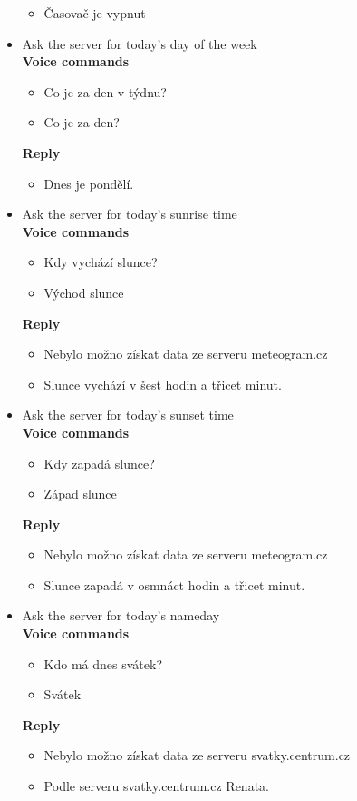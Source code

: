 \begin{itemize}
    \begin{itemize}
        \item Časovač je vypnut
    \end{itemize}
    \item Ask the server for today's day of the week\\
    \textbf{Voice commands}
    \begin{itemize}
        \item Co je za den v týdnu?
        \item Co je za den?
    \end{itemize}
    \textbf{Reply}
    \begin{itemize}
        \item Dnes je pondělí.
    \end{itemize}
    \item Ask the server for today's sunrise time\\
    \textbf{Voice commands}
    \begin{itemize}
        \item Kdy vychází slunce?
        \item Východ slunce
    \end{itemize}
    \textbf{Reply}
    \begin{itemize}
        \item Nebylo možno získat data ze serveru meteogram.cz
        \item Slunce vychází v šest hodin a třicet minut.
    \end{itemize}
    \item Ask the server for today's sunset time\\
    \textbf{Voice commands}
    \begin{itemize}
        \item Kdy zapadá slunce?
        \item Západ slunce
    \end{itemize}
    \textbf{Reply}
    \begin{itemize}
        \item Nebylo možno získat data ze serveru meteogram.cz
        \item Slunce zapadá v osmnáct hodin a třicet minut.
    \end{itemize}
    \item Ask the server for today's nameday\\
    \textbf{Voice commands}
    \begin{itemize}
        \item Kdo má dnes svátek?
        \item Svátek
    \end{itemize}
    \textbf{Reply}
    \begin{itemize}
        \item Nebylo možno získat data ze serveru svatky.centrum.cz
        \item Podle serveru svatky.centrum.cz Renata.
    \end{itemize}
\end{itemize}

